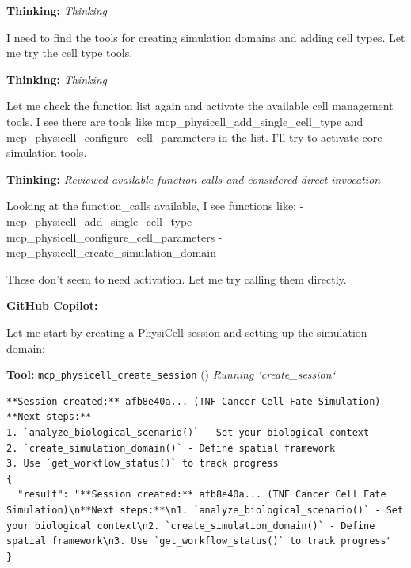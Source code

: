 \documentclass[11pt,a4paper]{article}
\begin{document}
\begin{thinkbox}
\textbf{Thinking:} \textit{Thinking}

I need to find the tools for creating simulation domains and adding cell types. Let me try the cell type tools.

\end{thinkbox}
\begin{thinkbox}
\textbf{Thinking:} \textit{Thinking}

Let me check the function list again and activate the available cell management tools. I see there are tools like mcp\_physicell\_add\_single\_cell\_type and mcp\_physicell\_configure\_cell\_parameters in the list. I'll try to activate core simulation tools.

\end{thinkbox}
\begin{thinkbox}
\textbf{Thinking:} \textit{Reviewed available function calls and considered direct invocation}

Looking at the function\_calls available, I see functions like:
- mcp\_physicell\_add\_single\_cell\_type
- mcp\_physicell\_configure\_cell\_parameters
- mcp\_physicell\_create\_simulation\_domain

These don't seem to need activation. Let me try calling them directly.

\end{thinkbox}
\begin{copilotbox}
\textbf{GitHub Copilot:}

Let me start by creating a PhysiCell session and setting up the simulation domain:

\end{copilotbox}
\begin{toolokbox}
\textbf{Tool:} \texttt{mcp\_physicell\_create\_session} (\checkmark)
\textit{Running `create\_session`}
\begin{lstlisting}
**Session created:** afb8e40a... (TNF Cancer Cell Fate Simulation)
**Next steps:**
1. `analyze_biological_scenario()` - Set your biological context
2. `create_simulation_domain()` - Define spatial framework
3. Use `get_workflow_status()` to track progress
{
  "result": "**Session created:** afb8e40a... (TNF Cancer Cell Fate Simulation)\n**Next steps:**\n1. `analyze_biological_scenario()` - Set your biological context\n2. `create_simulation_domain()` - Define spatial framework\n3. Use `get_workflow_status()` to track progress"
}
\end{lstlisting}
\end{toolokbox}
\end{document}

